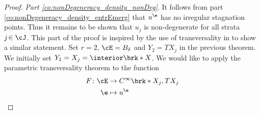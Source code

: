 \begin{proof}


  \emph{Part \ref{co:nonDegeneracy_density_nonDeg}}. 
  It follows from part \ref{co:nonDegeneracy_density_entrEmerg} that $u^\e$ has no
  irregular stagnation points. Thus it remains to be shown that $u_j$ is non-degenerate for all strata $j\!\in\cJ$.
  This part of the proof is inspired by the use of transversality in \cite[§6 Theorem 1.2]{Hirsch1994} to show a similar statement.
  Set $r=2$, $\cE=B_\delta$ and $Y_2=TX_j$ in the previous theorem.
  We initially set $Y_1=X_j=\openX$.
  We would like to apply the parametric transversality theorem to the function
  \begin{align*}
    F\colon \cE&\to C^\infty\brk*{X_j,TX_j} \\
    \e&\mapsto u^\e
  \end{align*}

\end{proof}
